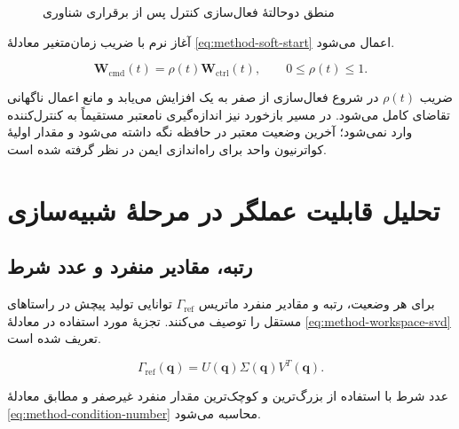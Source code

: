 \begin{figure}[htbp]
	\centering
	\caption{منطق دوحالتهٔ فعال‌سازی کنترل پس از برقراری شناوری}
	\label{fig:method-state-machine}
\end{figure}

آغاز نرم با ضریب زمان‌متغیر معادلهٔ \ref{eq:method-soft-start} اعمال می‌شود.

\begin{equation}
	\mathbf W_{\mathrm{cmd}}(t)=\rho(t)\mathbf W_{\mathrm{ctrl}}(t),
	\qquad 0\leq\rho(t)\leq1.
	\label{eq:method-soft-start}
\end{equation}

ضریب $\rho(t)$ در شروع فعال‌سازی از صفر به یک افزایش می‌یابد و مانع اعمال ناگهانی تقاضای کامل می‌شود. در مسیر بازخورد نیز اندازه‌گیری نامعتبر مستقیماً به کنترل‌کننده وارد نمی‌شود؛ آخرین وضعیت معتبر در حافظه نگه داشته می‌شود و مقدار اولیهٔ کواترنیون واحد برای راه‌اندازی ایمن در نظر گرفته شده است.

\section{تحلیل قابلیت عملگر در مرحلهٔ شبیه‌سازی}
\label{sec:method-singularity}

\subsection{رتبه، مقادیر منفرد و عدد شرط}

برای هر وضعیت، رتبه و مقادیر منفرد ماتریس $\Gamma_{\mathrm{ref}}$ توانایی تولید پیچش در راستاهای مستقل را توصیف می‌کنند. تجزیهٔ مورد استفاده در معادلهٔ \ref{eq:method-workspace-svd} تعریف شده است.

\begin{equation}
	\Gamma_{\mathrm{ref}}(\mathbf q)=U(\mathbf q)\Sigma(\mathbf q)V^T(\mathbf q).
	\label{eq:method-workspace-svd}
\end{equation}

عدد شرط با استفاده از بزرگ‌ترین و کوچک‌ترین مقدار منفرد غیرصفر و مطابق معادلهٔ \ref{eq:method-condition-number} محاسبه می‌شود.

